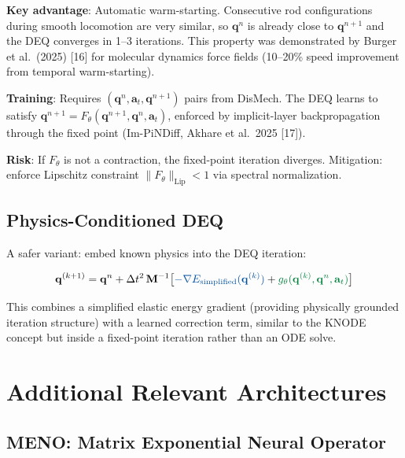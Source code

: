 \documentclass[11pt]{article}
\newcommand{\vect}[1]{\mathbf{#1}}
\newcommand{\mat}[1]{\mathbf{#1}}
\newcommand{\phys}[1]{{\color{physicsblue}#1}}
\newcommand{\nn}[1]{{\color{nngreen}#1}}
\begin{document}
\noindent
\textbf{Key advantage}: Automatic warm-starting.
Consecutive rod configurations during smooth locomotion are very similar, so $\vect{q}^n$ is already close to $\vect{q}^{n+1}$ and the DEQ converges in 1--3 iterations.
This property was demonstrated by Burger et al.\ (2025) [16] for molecular dynamics force fields (10--20\% speed improvement from temporal warm-starting).

\textbf{Training}: Requires $(\vect{q}^n, \vect{a}_t, \vect{q}^{n+1})$ pairs from DisMech.
The DEQ learns to satisfy $\vect{q}^{n+1} = F_\theta(\vect{q}^{n+1}, \vect{q}^n, \vect{a}_t)$, enforced by implicit-layer backpropagation through the fixed point (Im-PiNDiff, Akhare et al.\ 2025 [17]).

\textbf{Risk}: If $F_\theta$ is not a contraction, the fixed-point iteration diverges.
Mitigation: enforce Lipschitz constraint $\|F_\theta\|_{\text{Lip}} < 1$ via spectral normalization.

\subsection{Physics-Conditioned DEQ}

A safer variant: embed known physics into the DEQ iteration:

\begin{equation}
  \vect{q}^{(k+1)} = \vect{q}^n + \Delta t^2\,\mat{M}^{-1}\bigl[\phys{-\nabla E_{\text{simplified}}(\vect{q}^{(k)})} + \nn{g_\theta(\vect{q}^{(k)}, \vect{q}^n, \vect{a}_t)}\bigr]
  \label{eq:physics-deq}
\end{equation}

\noindent
This combines a simplified elastic energy gradient (providing physically grounded iteration structure) with a learned correction term, similar to the KNODE concept but inside a fixed-point iteration rather than an ODE solve.


\section{Additional Relevant Architectures}
\label{sec:additional}

\subsection{MENO: Matrix Exponential Neural Operator}
\end{document}
